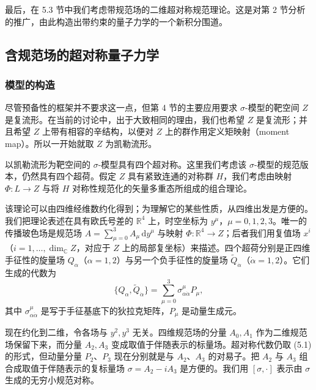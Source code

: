 \documentclass[11pt,a4paper,UTF8]{ctexart}
\theoremstyle{plain}
\theoremstyle{definition}
\begin{document}
最后，在 5.3 节中我们考虑带规范场的二维超对称规范理论。这是对第 2 节分析的推广，由此构造出带约束的量子力学的一个新积分围道。

\subsection{含规范场的超对称量子力学}

\subsubsection{模型的构造}

尽管预备性的框架并不要求这一点，但第 4 节的主要应用要求 $\sigma$-模型的靶空间 $Z$ 是复流形。在当前的讨论中，出于大致相同的理由，我们也希望 $Z$ 是复流形；并且希望 $Z$ 上带有相容的辛结构，以便对 $Z$ 上的群作用定义矩映射（moment map）。所以一开始就取 $Z$ 为凯勒流形。

以凯勒流形为靶空间的 $\sigma$-模型具有四个超对称。这里我们考虑该 $\sigma$-模型的规范版本，仍然具有四个超荷。假定 $Z$ 具有紧致连通的对称群 $H$，我们考虑由映射 $\Phi:L\to Z$ 与将 $H$ 对称性规范化的矢量多重态所组成的组合理论。

该理论可以由四维经维数约化得到；为理解它的某些性质，从四维出发是方便的。我们把理论表述在具有欧氏号差的 $\mathbb R^4$ 上，时空坐标为 $y^\mu$，$\mu=0,1,2,3$。唯一的传播玻色场是规范场 $A=\sum_{\mu=0}^{3}A_\mu\,\mathrm dy^\mu$ 与映射 $\Phi:\mathbb R^4\to Z$；后者我们用复值场 $x^i$（$i=1,\dots,\dim_{\mathbb C}Z$，对应于 $Z$ 上的局部复坐标）来描述。四个超荷分别是正四维手征性的旋量场 $Q_\alpha$（$\alpha=1,2$）与另一个负手征性的旋量场 $\tilde Q_{\dot\alpha}$（$\dot\alpha=1,2$）。它们生成的代数为
\begin{equation}
    \{Q_\alpha,\tilde Q_{\dot\alpha}\}=\sum_{\mu=0}^{3}\sigma^\mu_{\alpha\dot\alpha}P_\mu,
    \tag{5.1}
\end{equation}
其中 $\sigma^\mu_{\alpha\dot\alpha}$ 是写于手征基底下的狄拉克矩阵，$P_\mu$ 是动量生成元。


现在约化到二维，令各场与 $y^2,y^3$ 无关。四维规范场的分量 $A_0,A_1$ 作为二维规范场保留下来，而分量 $A_2,A_3$ 变成取值于伴随表示的标量场。超对称代数仍取 (5.1) 的形式，但动量分量 $P_2$、$P_3$ 现在分别就是与 $A_2$、$A_3$ 的对易子。把 $A_2$ 与 $A_3$ 组合成取值于伴随表示的复标量场 $\sigma=A_2-iA_3$ 是方便的。我们用 $[\sigma,\cdot]$ 表示由 $\sigma$ 生成的无穷小规范对称。
\end{document}
